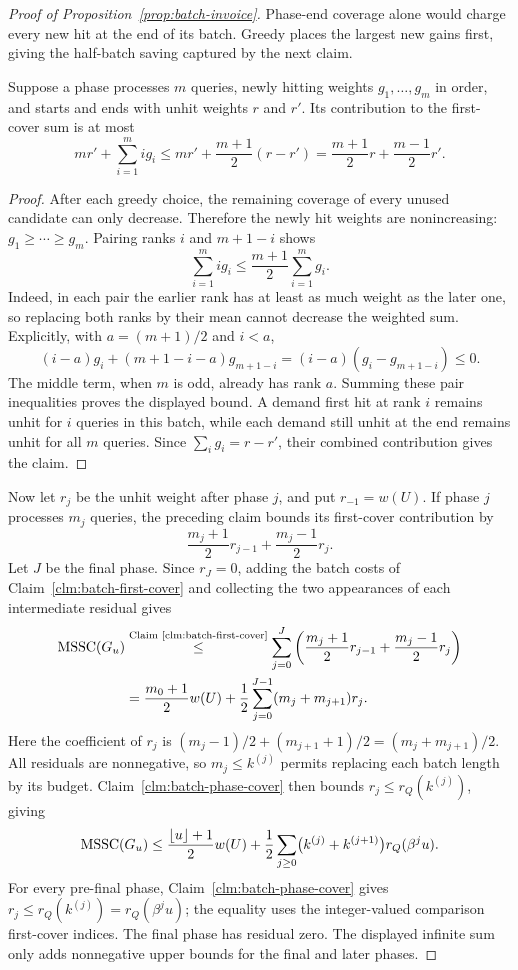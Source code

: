 \begin{proof}[Proof of Proposition~\ref{prop:batch-invoice}]
Phase-end coverage alone would charge every new hit at the end of its
batch. Greedy places the largest new gains first, giving the half-batch
saving captured by the next claim.

\begin{claim}
\label{clm:batch-first-cover}
Suppose a phase processes $m$ queries, newly hitting weights
$g_1,\ldots,g_m$ in order, and starts and ends with unhit weights
$r$ and $r'$. Its contribution to the first-cover sum is at most
\[
 mr'+\sum_{i=1}^m i g_i
 \le mr'+\frac{m+1}{2}(r-r')
 =\frac{m+1}{2}r+\frac{m-1}{2}r'.
\]
\end{claim}
\begin{proof}
After each greedy choice, the remaining coverage of every unused
candidate can only decrease. Therefore the newly hit weights are
nonincreasing: $g_1\ge\cdots\ge g_m$. Pairing ranks $i$ and
$m+1-i$ shows
\[
 \sum_{i=1}^m i g_i\le\frac{m+1}{2}\sum_{i=1}^m g_i.
\]
Indeed, in each pair the earlier rank has at least as much weight
as the later one, so replacing both ranks by their mean cannot
decrease the weighted sum. Explicitly, with $a=(m+1)/2$ and $i<a$,
\[
 (i-a)g_i+(m+1-i-a)g_{m+1-i}
 =(i-a)(g_i-g_{m+1-i})\le0.
\]
The middle term, when $m$ is odd, already has rank $a$.
Summing these pair inequalities proves the displayed bound.
A demand first hit at rank $i$ remains
unhit for $i$ queries in this batch, while each demand
still unhit at the end remains unhit for all $m$ queries. Since
$\sum_i g_i=r-r'$, their combined contribution gives the claim.
\end{proof}

Now let $r_j$ be the unhit weight after phase $j$, and put
$r_{-1}=w(U)$. If phase $j$ processes $m_j$ queries, the preceding
claim bounds its first-cover contribution by
\[
 \frac{m_j+1}{2}r_{j-1}+\frac{m_j-1}{2}r_j.
\]
Let $J$ be the final phase. Since $r_J=0$, adding the batch costs
of Claim~\ref{clm:batch-first-cover} and collecting the two
appearances of each intermediate residual gives
\[
\begin{aligned}
 \MSSC(G_u)
 &\byref{Claim}{clm:batch-first-cover}{\le}\sum_{j=0}^{J}
       \left(\frac{m_j+1}{2}r_{j-1}+\frac{m_j-1}{2}r_j\right)\\
 &=\frac{m_0+1}{2}w(U)
     +\frac12\sum_{j=0}^{J-1}(m_j+m_{j+1})r_j.
\end{aligned}
\]
Here the coefficient of $r_j$ is
$(m_j-1)/2+(m_{j+1}+1)/2=(m_j+m_{j+1})/2$.
All residuals are nonnegative, so $m_j\le k^{(j)}$ permits replacing
each batch length by its budget. Claim~\ref{clm:batch-phase-cover} then bounds
$r_j\le r_Q(k^{(j)})$, giving
\[
 \operatorname{MSSC}(G_u)\le
 \frac{\lfloor u\rfloor+1}{2}w(U)
 +\frac12\sum_{j\ge0}
       \bigl(k^{(j)}+k^{(j+1)}\bigr)r_Q(\beta^ju).
\]
For every pre-final phase, Claim~\ref{clm:batch-phase-cover} gives
$r_j\le r_Q(k^{(j)})=r_Q(\beta^ju)$; the equality uses the
integer-valued comparison first-cover indices. The final phase
has residual zero. The displayed infinite sum only adds
nonnegative upper bounds for the final and later phases.

\end{proof}

